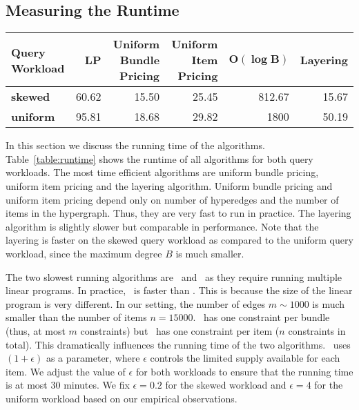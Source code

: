 \subsection{Measuring the Runtime}

\begin{table*}[] \centering
	\begin{small}
		\begin{tabular}{@{}lrrrrr@{}}\toprule
			\textbf{Query Workload} & \textbf{LP} & \textbf{Uniform Bundle Pricing} & \textbf{Uniform Item Pricing} & $\mathbf{O(\log B)}$ & \textbf{Layering}  \\ \midrule
			
			\textbf{skewed} &  60.62 & 15.50 & 25.45 & 812.67 & 15.67 \\ \hdashline
			\textbf{uniform} &  95.81 & 18.68 &  29.82 &1800 & 50.19 \\
			\bottomrule
		\end{tabular}
	\end{small}
	\caption{Algorithm running times (in seconds) for different workloads. }
	\label{table:runtime}
\end{table*}

In this section we discuss the running time of the algorithms. Table~\ref{table:runtime} shows the runtime of all algorithms for both query workloads. The most time efficient algorithms are uniform bundle pricing, uniform item pricing and the layering algorithm. Uniform bundle pricing and uniform item pricing depend only on number of hyperedges and the number of items in the hypergraph. Thus, they are very fast to run in practice. The layering algorithm is slightly slower but comparable in performance. Note that the layering is faster on the skewed query workload as compared to the uniform query workload, since the maximum degree $B$ is much smaller. 

The two slowest running algorithms are \lpip\ and \cip\ as they require running multiple linear programs. In practice, \lpip\ is faster than \cip. This is because the size of the linear program is very different. In our setting, the number of edges $m \sim 1000$ is much smaller than the number of items $n = 15000$. \lpip\  has one constraint per bundle (thus, at most $m$ constraints) but \cip\ has one constraint per item ($n$ constraints in total). This dramatically influences the running time of the two algorithms. \cip\ uses $(1+\epsilon)$ as a parameter, where $\epsilon$ controls the limited supply available for each item. We adjust the value of $\epsilon$ for both workloads to ensure that the running time is at most $30$ minutes. We fix $\epsilon = 0.2$ for the skewed workload and $\epsilon = 4$ for the uniform workload based on our empirical observations.
